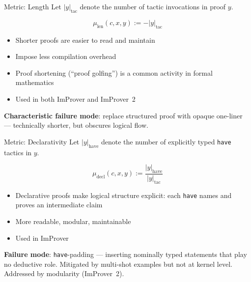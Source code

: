 \begin{frame}{Metric: Length}
\vspace{0.5em}
Let $|y|_{\mathrm{tac}}$ denote the number of tactic invocations in proof $y$.
\vspace{0.5em}
\begin{definition}
\[
  \mu_{\mathrm{len}}(c,x,y) := -|y|_{\mathrm{tac}}
\]
\end{definition}
\vspace{0.5em}
\begin{itemize}\setlength{\itemsep}{8pt}
  \item Shorter proofs are easier to read and maintain
  \item Impose less compilation overhead
  \item Proof shortening (``proof golfing'') is a common activity in formal mathematics
  \item Used in both ImProver and ImProver~2
\end{itemize}
\vspace{0.5em}
\textbf{Characteristic failure mode}: replace structured proof with opaque one-liner --- technically shorter, but obscures logical flow.
\end{frame}

\begin{frame}{Metric: Declarativity}
\vspace{0.4em}
Let $|y|_{\mathrm{have}}$ denote the number of explicitly typed \texttt{have} tactics in $y$.
\vspace{0.4em}
\begin{definition}
\[
  \mu_{\mathrm{decl}}(c,x,y) := \frac{|y|_{\mathrm{have}}}{|y|_{\mathrm{tac}}}
\]
\end{definition}
\vspace{0.4em}
\begin{itemize}\setlength{\itemsep}{8pt}
  \item Declarative proofs make logical structure explicit: each \texttt{have} names and proves an intermediate claim
  \item More readable, modular, maintainable
  \item Used in ImProver
\end{itemize}
\vspace{0.4em}
\textbf{Failure mode}: \texttt{have}-padding --- inserting nominally typed statements that play no deductive role. Mitigated by multi-shot examples but not at kernel level. Addressed by modularity (ImProver~2).
\end{frame}

